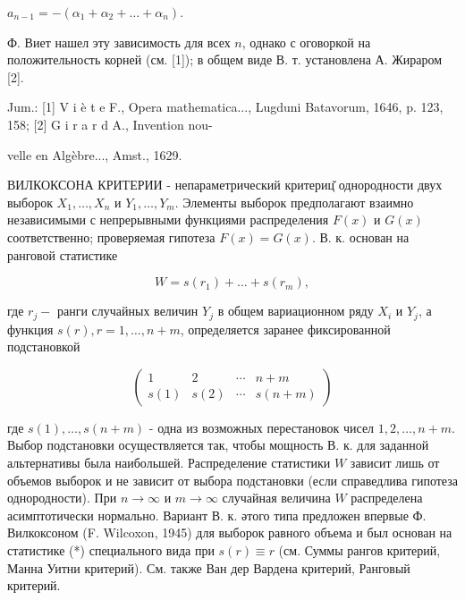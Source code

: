 \documentclass[10pt]{article}
\begin{document}
$a_{n-1}=-\left(\alpha_{1}+\alpha_{2}+\ldots+\alpha_{n}\right)$.



Ф. Виет нашел эту зависимость для всех $n$, однако с оговоркой на положительность корней (см. [1]); в общем виде В. т. установлена А. Жираром [2].



Jum.: [1] V i è t e F., Opera mathematica..., Lugduni Batavorum, 1646, p. 123, 158; [2] G i r a r d A., Invention nou-

velle en Algèbre..., Amst., 1629.



ВИЛКОКСОНА КРИТЕРИИ - непараметрический критериц̆ однородности двух выборок $X_{1}, \ldots, X_{n}$ и $Y_{1}, \ldots, Y_{m}$. Элементы выборок предполагают взаимно независимыми с непрерывными функциями распределения $F(x)$ и $G(x)$ соответственно; проверяемая гипотеза $F(x)=G(x)$. В. к. основан на ранговой статистике



\[

W=s\left(r_{1}\right)+\ldots+s\left(r_{m}\right),

\]



где $r_{j}-$ ранги случайных величин $Y_{j}$ в общем вариационном ряду $X_{i}$ и $Y_{j}$, а функция $s(r), r=1, \ldots, n+m$, определяется заранее фиксированной подстановкой



\[

\left(\begin{array}{cccc}

1 & 2 & \cdots & n+m \\

s(1) & s(2) & \cdots & s(n+m)

\end{array}\right)

\]



где $s(1), \ldots, s(n+m)$ - одна из возможных перестановок чисел $1,2, \ldots, n+m$. Выбор подстановки осуществляется так, чтобы мощность В. к. для заданной альтернативы была наибольшей. Распределение статистики $W$ зависит лишь от объемов выборок и не зависит от выбора подстановки (если справедлива гипотеза однородности). При $n \rightarrow \infty$ и $m \rightarrow \infty$ случайная величина $W$ распределена асимптотически нормально. Вариант В. к. әтого типа предложен впервые Ф. Вилкоксоном (F. Wilcoxon, 1945) для выборок равного объема и был основан на статистике (*) специального вида при $s(r) \equiv r$ (см. Суммы рангов критерий, Манна Уитни критерий). См. также Ван дер Вардена критерий, Ранговый критерий.
\end{document}
